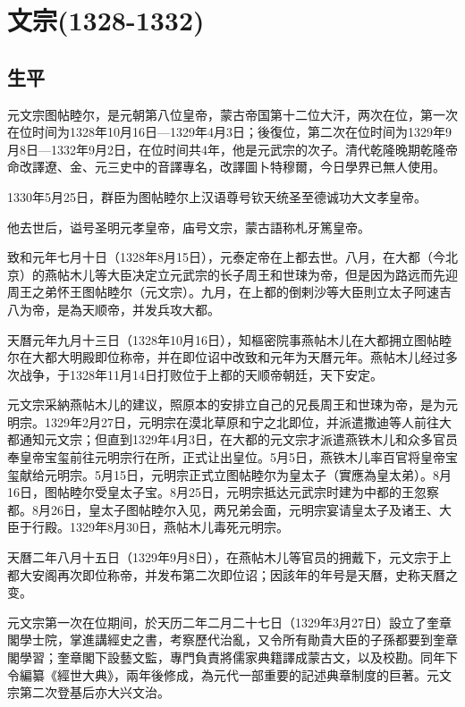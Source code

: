 
\section{文宗\tiny(1328-1332)}

\subsection{生平}

元文宗图帖睦尔，是元朝第八位皇帝，蒙古帝国第十二位大汗，两次在位，第一次在位时间为1328年10月16日—1329年4月3日；後復位，第二次在位时间为1329年9月8日—1332年9月2日，在位时间共4年，他是元武宗的次子。清代乾隆晚期乾隆帝命改譯遼、金、元三史中的音譯專名，改譯圖卜特穆爾，今日學界已無人使用。

1330年5月25日，群臣为图帖睦尔上汉语尊号钦天统圣至德诚功大文孝皇帝。

他去世后，谥号圣明元孝皇帝，庙号文宗，蒙古語称札牙篤皇帝。

致和元年七月十日（1328年8月15日），元泰定帝在上都去世。八月，在大都（今北京）的燕帖木儿等大臣决定立元武宗的长子周王和世㻋为帝，但是因为路远而先迎周王之弟怀王图帖睦尔（元文宗）。九月，在上都的倒剌沙等大臣則立太子阿速吉八为帝，是為天顺帝，并发兵攻大都。

天曆元年九月十三日（1328年10月16日），知樞密院事燕帖木儿在大都拥立图帖睦尔在大都大明殿即位称帝，并在即位诏中改致和元年为天曆元年。燕帖木儿经过多次战争，于1328年11月14日打败位于上都的天顺帝朝廷，天下安定。

元文宗采納燕帖木儿的建议，照原本的安排立自己的兄長周王和世㻋为帝，是为元明宗。1329年2月27日，元明宗在漠北草原和宁之北即位，并派遣撒迪等人前往大都通知元文宗；但直到1329年4月3日，在大都的元文宗才派遣燕铁木儿和众多官员奉皇帝宝玺前往元明宗行在所，正式让出皇位。5月5日，燕铁木儿率百官将皇帝宝玺献给元明宗。5月15日，元明宗正式立图帖睦尔为皇太子（實應為皇太弟）。8月16日，图帖睦尔受皇太子宝。8月25日，元明宗抵达元武宗时建为中都的王忽察都。8月26日，皇太子图帖睦尔入见，两兄弟会面，元明宗宴请皇太子及诸王、大臣于行殿。1329年8月30日，燕帖木儿毒死元明宗。

天曆二年八月十五日（1329年9月8日），在燕帖木儿等官员的拥戴下，元文宗于上都大安阁再次即位称帝，并发布第二次即位诏；因該年的年号是天曆，史称天曆之变。

元文宗第一次在位期间，於天历二年二月二十七日（1329年3月27日）設立了奎章閣學士院，掌進講經史之書，考察歷代治亂，又令所有勛貴大臣的子孫都要到奎章閣學習；奎章閣下設藝文監，專門負責將儒家典籍譯成蒙古文，以及校勘。同年下令編纂《經世大典》，兩年後修成，為元代一部重要的記述典章制度的巨著。元文宗第二次登基后亦大兴文治。

